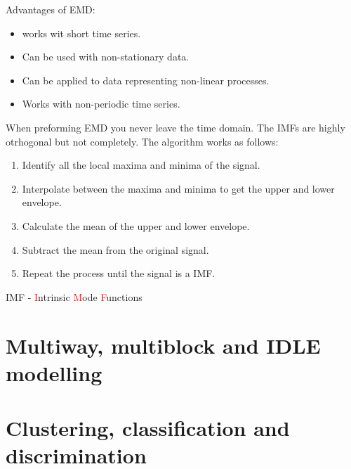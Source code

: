 Advantages of EMD:
\begin{itemize}
    \item works wit short time series.
    \item Can be used with non-stationary data.
    \item Can be applied to data representing non-linear processes.
    \item Works with non-periodic time series.
\end{itemize}
When preforming EMD you never leave the time domain. The IMFs are highly otrhogonal but not completely. The algorithm works as follows:
\begin{enumerate}
    \item Identify all the local maxima and minima of the signal.
    \item Interpolate between the maxima and minima to get the upper and lower envelope.
    \item Calculate the mean of the upper and lower envelope.
    \item Subtract the mean from the original signal.
    \item Repeat the process until the signal is a IMF.
\end{enumerate}

IMF - \textcolor{red}{I}ntrinsic \textcolor{red}{M}ode \textcolor{red}{F}unctions


\section{Multiway, multiblock and IDLE modelling}

\section{Clustering, classification and discrimination}

